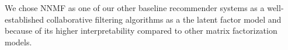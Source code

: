        We chose NNMF as one of our other baseline recommender systems as a well-established collaborative filtering algorithms as a the latent factor model and because of its higher interpretability compared to other matrix factorization models.
       
       

        
        
        
        
    
        

